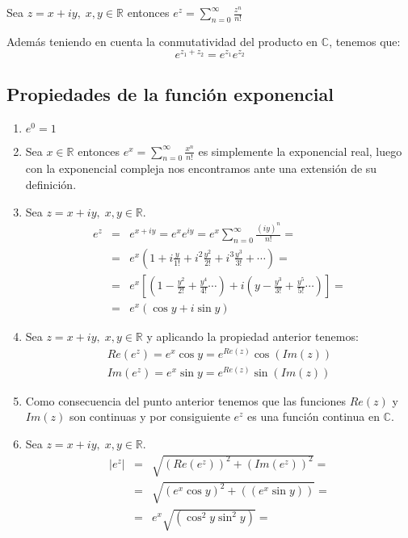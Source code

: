 Sea \(z=x+iy, \; x,y\in \mathbb{R}\) entonces \(e^z=\sum\limits_{n=0}^{\infty}\frac{z^n}{n!}\)

Además teniendo en cuenta la conmutatividad del producto en \(\mathbb{C}\), tenemos que:
\[e^{z_1+z_2}=e^{z_1}e^{z_2}\]

\subsection{Propiedades de la función exponencial}
\begin{enumerate}
  \item \(e^0=1\)
  \item Sea \(x\in \mathbb{R}\) entonces \(e^x=\sum\limits_{n=0}^{\infty}\frac{x^n}{n!}\) es simplemente la exponencial real, luego con la exponencial compleja nos encontramos ante una extensión de su definición.
  \item Sea \(z=x+iy, \; x,y\in \mathbb{R}\).
    \begin{eqnarray*}
      e^z & = & e^{x+iy}=e^xe^{iy}=e^x\sum\limits_{n=0}^{\infty}\frac{(iy)^n}{n!}= \\
          & = & e^x\left( 1+i\frac{y}{1!}+i^2\frac{y^2}{2!}+i^3\frac{y^3}{3!}+ \cdots \right) = \\
          & = & e^x\left[ \left( 1-\frac{y^2}{2!}+\frac{y^4}{4!} \cdots \right) + i\left( y-\frac{y^3}{3!}+\frac{y^5}{5!} \cdots \right)\right] = \\
          & = & e^x(\cos{y}+i\sin{y})
    \end{eqnarray*}
  \item Sea \(z=x+iy, \; x,y\in \mathbb{R}\) y aplicando la propiedad anterior tenemos:
    \begin{eqnarray*}
      Re(e^z)=e^x\cos{y}=e^{Re(z)}\cos(Im(z)) \\
      Im(e^z)=e^x\sin{y}=e^{Re(z)}\sin(Im(z))
    \end{eqnarray*} 
  \item Como consecuencia del punto anterior tenemos que las funciones \(Re(z)\) y \(Im(z)\) son continuas y por consiguiente \(e^z\) es una función continua en \(\mathbb{C}\).
  \item Sea \(z=x+iy, \; x,y\in \mathbb{R}\).
    \begin{eqnarray*}
      |e^z| & = & \sqrt{(Re(e^z))^2+(Im(e^z))^2} =  \\
            & = & \sqrt{(e^x\cos{y})^2+((e^x\sin{y}))} = \\
            & = & e^x \sqrt{(\cos^2{y}\sin^2{y})} = \\

\end{eqnarray*}
\end{enumerate}
